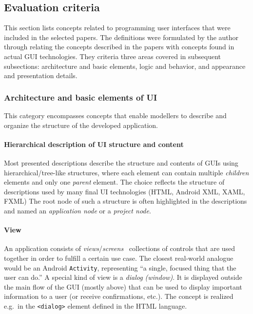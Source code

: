 \subsection{Evaluation criteria}\label{subsec:evaluation-criteria}

This section lists concepts related to programming user interfaces that were included in the selected papers.
The definitions were formulated by the author through relating the concepts described in the papers with concepts found in actual GUI technologies.
They criteria three areas covered in subsequent subsections: architecture and basic elements, logic and behavior, and appearance and presentation details.

\subsubsection{Architecture and basic elements of UI}
This category encompasses concepts that enable modellers to describe and organize the structure of the developed application.

\paragraph{Hierarchical description of UI structure and content}
Most presented descriptions describe the structure and contents of GUIs using hierarchical/tree-like structures, where each element can contain multiple \emph{children} elements and only one \emph{parent} element.
The choice reflects the structure of descriptions used by many final UI technologies (HTML, Android XML, XAML, FXML)
The root node of such a structure is often highlighted in the descriptions and named an \emph{application node} or a \emph{project node}.

\paragraph{View}
An application consists of \emph{views}/\emph{screens} \textendash\ collections of controls that are used together in order to fulfill a certain use case.
The closest real-world analogue would be an Android \texttt{Activity}, representing \enquote{a single, focused thing that the user can do.}
A special kind of view is a \emph{dialog (window)}.
It is displayed outside the main flow of the GUI (mostly above) that can be used to display important information to a user (or receive confirmations, etc.).
The concept is realized e.g.\ in the \texttt{<dialog>} element defined in the HTML language.


